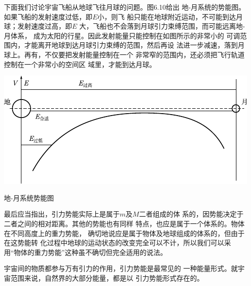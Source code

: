 下面我们讨论宇宙飞船从地球飞往月球的问题。图6.10给出
地-月系统的势能图。如果飞船的发射速度过低，即$ E $小，则飞
船只能在地球附近运动，不可能到达月球；发射速度过高，即$ E $
大，飞船也不会落到月球引力束缚范围，而可能远离地-月体系，
成为太阳的行星。因此发射能量只能控制在如图所示的非常小的
可调范围内，才能离开地球到达月球引力束缚的范围，然后再设
法进一步减速，落到月球上。再有，不仅要把发射能量控制在一个
非常窄的范围内，还必须把飞行轨道控制在一个非常小的空间区
域里，才能到达月球。

\begin{figurex}
    \centering
    \includegraphics{figure/fig06.10}
    \caption{地-月系统势能图}
    \label{fig:06.10}
\end{figurex}

最后应当指出，引力势能实际上是属于$ m $及$ M $二者组成的体
系的，因势能决定于二者之间的相对距离。其他的势能也有同样
特点，也应是属于一个体系的。物体在不同高度上的重力势能，
确切地说应是属于物体及地球组成的体系的，但由于在这势能转
化过程中地球的运动状态的改变完全可以不计，所以我们可以采
用“物体的重力势能”这种虽不确切但完全适用的说法。

宇宙间的物质都参与万有引力的作用，引力势能是最常见的
一种能量形式。就宇宙范围来说，自然界的大部分能量，都是以
引力势能形式存在的。